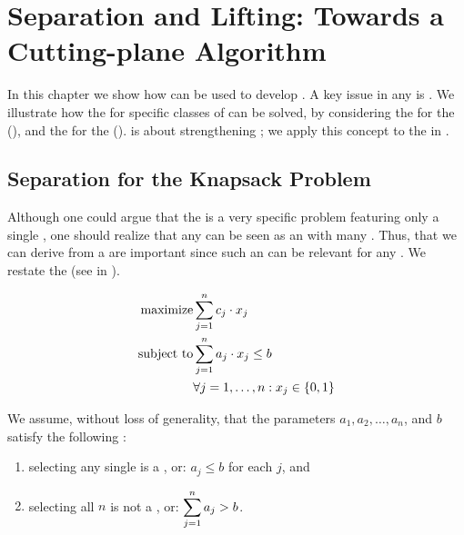 \chapter{Separation and Lifting: Towards a Cutting-plane Algorithm}
In this chapter we show how  can be used to develop . A key issue in any  is . We illustrate how the  for specific classes of  can be solved, by considering the  for the  (), and the  for the  ().  is about strengthening ; we apply this concept to the  in .

\section{Separation for the Knapsack Problem}
Although one could argue that the  is a very specific problem featuring only a single , one should realize that any  can be seen as an  with many . Thus,  that we can derive from a  are important since such an  can be relevant for any . We restate the  (see  in ).

\begin{eqnarray}
\mbox{maximize}&\sumieqb[j]{1}{n}{c_j\cdot x_j}\eqnlab{knapsack4-m}\\
\mbox{subject to}&\sumieqb[j]{1}{n}{a_j\cdot x_j}\leq b\eqnlab{knapsack4-c1}\\
&\forall\rangei[j]{1}{n}:x_j\in\accl{0,1}\eqnlab{knapsack4-c2}
\end{eqnarray}

We assume, without loss of generality, that the parameters $a_1,a_2,\ldots,a_n$, and $b$ satisfy the following :

\begin{enumerate}
 \item selecting any single  is a , or: $a_j\leq b$ for each $j$, and
 \item selecting all $n$  is not a , or: $\sumieqb[j]{1}{n}{a_j}>b$.
\end{enumerate}

